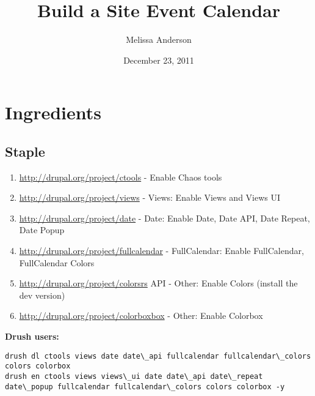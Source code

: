 \documentclass[letterpaper,10pt,english]{sphinxmanual}
\title{Build a Site Event Calendar}
\date{December 23, 2011}
\author{Melissa Anderson}
\begin{document}
\maketitle
\tableofcontents
{}\label{index::doc}



\chapter{Ingredients}
\label{event_calendar::doc}\label{event_calendar:ingredients}

\section{Staple}
\label{event_calendar:staple}\begin{enumerate}
\item {} 
\href{http://drupal.org/project/ctools}{http://drupal.org/project/ctools} - Enable Chaos tools

\item {} 
\href{http://drupal.org/project/views}{http://drupal.org/project/views} - Views: Enable Views and Views UI

\item {} 
\href{http://drupal.org/project/date}{http://drupal.org/project/date} - Date: Enable Date, Date API, Date Repeat, Date Popup

\item {} 
\href{http://drupal.org/project/fullcalendar}{http://drupal.org/project/fullcalendar} - FullCalendar: Enable FullCalendar, FullCalendar Colors

\item {} 
\href{http://drupal.org/project/colorsrs}{http://drupal.org/project/colorsrs} API - Other: Enable Colors (install the dev version)

\item {} 
\href{http://drupal.org/project/colorboxbox}{http://drupal.org/project/colorboxbox} - Other: Enable Colorbox

\end{enumerate}

\textbf{Drush users:}

\begin{Verbatim}[commandchars=\\\{\}]
drush dl ctools views date date\_api fullcalendar fullcalendar\_colors colors colorbox
drush en ctools views views\_ui date date\_api date\_repeat date\_popup fullcalendar fullcalendar\_colors colors colorbox -y
\end{Verbatim}
\end{document}
